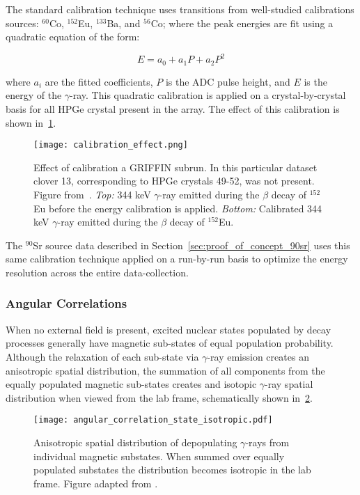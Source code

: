 \documentclass[cnatzke_thesis_proposal.tex]{subfiles}
\begin{document}
The standard calibration technique uses transitions from well-studied calibrations sources: $^{60}$Co, $^{152}$Eu, $^{133}$Ba, and $^{56}$Co; where the peak energies are fit using a quadratic equation of the form: 

\begin{equation}
  E = a_0 + a_1 P + a_2 P^2
\end{equation}

where $a_i$ are the fitted coefficients, $P$ is the ADC pulse height, and $E$ is the energy of the $\gamma$-ray. 
This quadratic calibration is applied on a crystal-by-crystal basis for all HPGe crystal present in the array. 
The effect of this calibration is shown in~\ref{fig:calibration_effect}. 

\begin{figure}[htbp]
  \centering
  \texttt{[image: calibration\_effect.png]}
  \caption{Effect of calibration a GRIFFIN subrun. In this particular dataset clover 13, corresponding to HPGe crystals 49-52, was not present. Figure from~\cite{maclean_spectroscopy_2021}.
    \textit{Top:} 344 keV $\gamma$-ray emitted during the $\beta$ decay of $^{152}$Eu before the energy calibration is applied. 
    \textit{Bottom:} Calibrated 344 keV $\gamma$-ray emitted during the $\beta$ decay of $^{152}$Eu. 
  }
  \label{fig:calibration_effect}
\end{figure}

The $^{90}$Sr source data described in Section~\ref{sec:proof_of_concept_90sr} uses this same calibration technique applied on a run-by-run basis to optimize the energy resolution across the entire data-collection.

\subsubsection{Angular Correlations}
When no external field is present, excited nuclear states populated by decay processes generally have magnetic sub-states of equal population probability. 
Although the relaxation of each sub-state via $\gamma$-ray emission creates an anisotropic spatial distribution, the summation of all components from the equally populated magnetic sub-states creates and isotopic $\gamma$-ray spatial distribution when viewed from the lab frame, schematically shown in~\ref{fig:angular_correlation_substate}.

\begin{figure}[htbp]
  \centering
  \texttt{[image: angular\_correlation\_state\_isotropic.pdf]}
  \caption{Anisotropic spatial distribution of depopulating $\gamma$-rays from individual magnetic substates. When summed over equally populated substates the distribution becomes isotropic in the lab frame. Figure adapted from \cite{maclean_spectroscopy_2021}.}
  \label{fig:angular_correlation_substate}
\end{figure}
\end{document}
